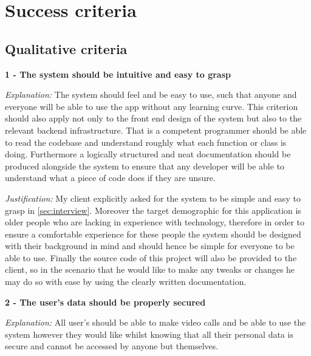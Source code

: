 \section{Success criteria}

\subsection{Qualitative criteria}

\textsf{\bfseries 1 - The system should be intuitive and easy to grasp}
\vspace{0.1cm}

\textit{Explanation:}
The system should feel and be easy to use, such that anyone
and everyone will be able to use the app without any learning
curve. This criterion should also apply not only to the front
end design of the system but also to the relevant backend 
infrastructure. That is a competent programmer should be able to 
read the codebase and understand roughly what each function or 
class is doing. Furthermore a logically structured and neat 
documentation should be produced alongside the system to 
ensure that any developer will be able to understand what 
a piece of code does if they are unsure.

\vspace{0.1cm}

\textit{Justification:} 
My client explicitly asked for the system to be simple and 
easy to grasp in \ref{sec:interview}. Moreover the target 
demographic for this application is older people who are 
lacking in experience with technology, therefore in order to 
ensure a comfortable experience for these people the system 
should be designed with their background in mind and should
hence be simple for everyone to be able to use. Finally the 
source code of this project will also be provided to the 
client, so in the scenario that he would like to make any 
tweaks or changes he may do so with ease by using the clearly 
written documentation.

\vspace{0.2cm}

\textsf{\bfseries 2 - The user's data should be properly secured} 

\vspace{0.1cm}

\textit{Explanation:} 
All user's should be able to make video calls and be able to 
use the system however they would like whilst knowing that all
their personal data is secure and cannot be accessed by anyone
but themselves.


